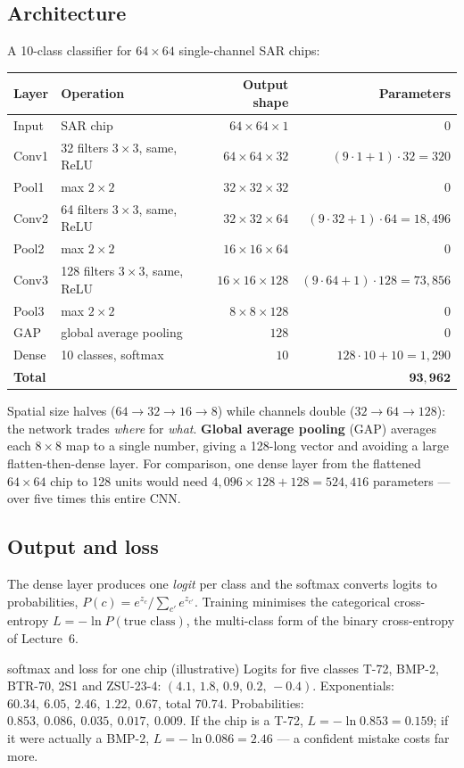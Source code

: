 \documentclass[11pt]{article}
\begin{document}
\subsection{Architecture}
A 10-class classifier for $64\times64$ single-channel SAR chips:
\begin{center}\small\renewcommand{\arraystretch}{1.2}
\begin{tabular}{llrr}\toprule
\textbf{Layer} & \textbf{Operation} & \textbf{Output shape} & \textbf{Parameters}\\\midrule
Input & SAR chip & $64\times64\times1$ & 0\\
Conv1 & 32 filters $3\times3$, same, ReLU & $64\times64\times32$ & $(9\cdot1+1)\cdot32=320$\\
Pool1 & max $2\times2$ & $32\times32\times32$ & 0\\
Conv2 & 64 filters $3\times3$, same, ReLU & $32\times32\times64$ & $(9\cdot32+1)\cdot64=18{,}496$\\
Pool2 & max $2\times2$ & $16\times16\times64$ & 0\\
Conv3 & 128 filters $3\times3$, same, ReLU & $16\times16\times128$ & $(9\cdot64+1)\cdot128=73{,}856$\\
Pool3 & max $2\times2$ & $8\times8\times128$ & 0\\
GAP & global average pooling & $128$ & 0\\
Dense & 10 classes, softmax & $10$ & $128\cdot10+10=1{,}290$\\\midrule
\multicolumn{3}{l}{\textbf{Total}} & $\mathbf{93{,}962}$\\\bottomrule
\end{tabular}\end{center}
Spatial size halves ($64\to32\to16\to8$) while channels double ($32\to64\to128$): the network trades \emph{where} for \emph{what}. \textbf{Global average pooling} (GAP) averages each $8\times8$ map to a single number, giving a 128-long vector and avoiding a large flatten-then-dense layer. For comparison, one dense layer from the flattened $64\times64$ chip to 128 units would need $4{,}096\times128+128=524{,}416$ parameters --- over five times this entire CNN.

\subsection{Output and loss}
The dense layer produces one \emph{logit} per class and the softmax converts logits to probabilities, $P(c)=e^{z_c}/\sum_{c'}e^{z_{c'}}$. Training minimises the categorical cross-entropy $L=-\ln P(\text{true class})$, the multi-class form of the binary cross-entropy of Lecture~6.
\begin{example}{softmax and loss for one chip (illustrative)}
Logits for five classes T-72, BMP-2, BTR-70, 2S1 and ZSU-23-4: $(4.1,\,1.8,\,0.9,\,0.2,\,-0.4)$. Exponentials: $60.34,\ 6.05,\ 2.46,\ 1.22,\ 0.67$, total $70.74$. Probabilities: $0.853,\ 0.086,\ 0.035,\ 0.017,\ 0.009$. If the chip is a T-72, $L=-\ln0.853=0.159$; if it were actually a BMP-2, $L=-\ln0.086=2.46$ --- a confident mistake costs far more.
\end{example}
\end{document}
